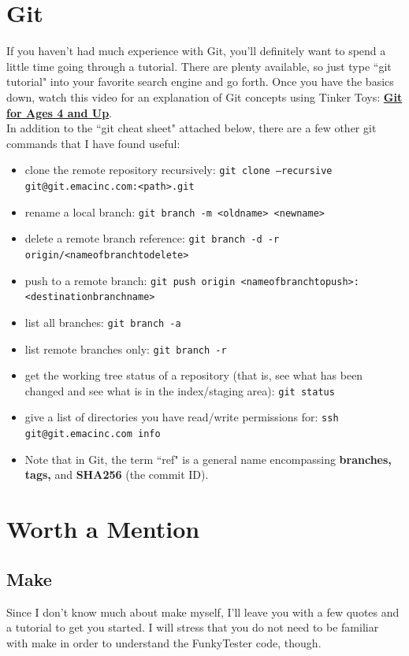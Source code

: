\documentclass{report}
\begin{document}
\begin{appendices}
\chapter{Git}	\label{app:git}
If you haven't had much experience with Git, you'll definitely want to spend a little time going through a tutorial. There are plenty available, so just type ``git tutorial" into your favorite search engine and go forth. Once you have the basics down, watch this video for an explanation of Git concepts using Tinker Toys: \href{http://blip.tv/open-source-developers-conference/git-for-ages-4-and-up-4460524}{\textbf{Git for Ages 4 and Up}}.\\
In addition to the ``git cheat sheet" attached below, there are a few other git commands that I have found useful:
	\begin{itemize}
	\item clone the remote repository recursively: \texttt{git clone --recursive git@git.emacinc.com:<path>.git}
	\item rename a local branch: \texttt{git branch -m <oldname> <newname>}
	\item delete a remote branch reference: \texttt{git branch -d -r origin/<nameofbranchtodelete>}
	\item push to a remote branch: \texttt{git push origin <nameofbranchtopush>:<destinationbranchname>}
	\item list all branches: \texttt{git branch -a}
	\item list remote branches only: \texttt{git branch -r}
	\item get the working tree status of a repository (that is, see what has been changed and see what is in the index/staging area): \texttt{git status}
	\item give a list of directories you have read/write permissions for: \texttt{ssh git@git.emacinc.com info}
	\item Note that in Git, the term ``ref" is a general name encompassing \textbf{branches, tags,} and \textbf{SHA256} (the commit ID).
	\end{itemize}


\chapter{Worth a Mention} \label{app:last}
\section{Make} \label{app:make}
Since I don't know much about make myself, I'll leave you with a few quotes and a tutorial to get you started. I will stress that you do not need to be familiar with make in order to understand the FunkyTester code, though.


\end{appendices}
\end{document}
